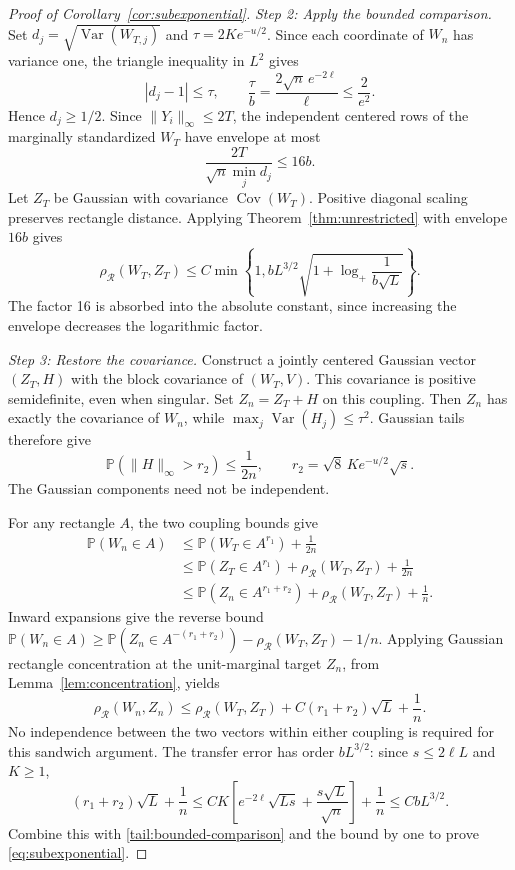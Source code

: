 \documentclass[11pt,letterpaper]{article}
\theoremstyle{remark}
\newcommand{\Pp}{\mathbb P}
\newcommand{\Cov}{\operatorname{Cov}}
\newcommand{\Var}{\operatorname{Var}}
\newcommand{\rh}{\rho_{\mathcal R}}
\begin{document}
\begin{proof}[Proof of Corollary~\ref{cor:subexponential}]
\emph{Step 2: Apply the bounded comparison.}
Set \(d_j=\sqrt{\Var(W_{T,j})}\) and \(\tau=2Ke^{-u/2}\).
Since each coordinate of \(W_n\) has variance one, the triangle
inequality in \(L^2\) gives
\[
 |d_j-1|\le\tau,
 \qquad \frac\tau b=\frac{2\sqrt n\,e^{-2\ell}}\ell
 \le\frac2{e^2}.
\]
Hence \(d_j\ge1/2\). Since \(\|Y_i\|_\infty\le2T\), the
independent centered rows of the marginally standardized \(W_T\)
have envelope at most
\[
 \frac{2T}{\sqrt n\min_jd_j}\le16b.
\]
Let \(Z_T\) be Gaussian with covariance \(\Cov(W_T)\).
Positive diagonal scaling preserves rectangle distance. Applying
Theorem~\ref{thm:unrestricted} with envelope \(16b\) gives
\begin{equation}
 \rh(W_T,Z_T)\le C\min\left\{1,
 bL^{3/2}\sqrt{1+\log_+\frac1{b\sqrt L}}\right\}.
 \label{tail:bounded-comparison}
\end{equation}
The factor 16 is absorbed into the absolute constant, since increasing
the envelope decreases the logarithmic factor.

\emph{Step 3: Restore the covariance.}
Construct a jointly centered Gaussian vector \((Z_T,H)\) with the
block covariance of \((W_T,V)\). This covariance is positive
semidefinite, even when singular. Set \(Z_n=Z_T+H\) on this coupling.
Then \(Z_n\) has exactly the covariance of \(W_n\), while
\(\max_j\Var(H_j)\le\tau^2\). Gaussian tails therefore give
\begin{equation}
 \Pp(\|H\|_\infty>r_2)\le\frac1{2n},\qquad
 r_2=\sqrt8\,Ke^{-u/2}\sqrt s.
 \label{tail:Gaussian-coupling}
\end{equation}
The Gaussian components need not be independent.

For any rectangle \(A\), the two coupling bounds give
\begin{align*}
 \Pp(W_n\in A)
 &\le\Pp(W_T\in A^{r_1})+\frac1{2n}\\
 &\le\Pp(Z_T\in A^{r_1})+\rh(W_T,Z_T)+\frac1{2n}\\
 &\le\Pp(Z_n\in A^{r_1+r_2})+\rh(W_T,Z_T)+\frac1n.
\end{align*}
Inward expansions give the reverse bound
\(\Pp(W_n\in A)\ge\Pp(Z_n\in A^{-(r_1+r_2)})
-\rh(W_T,Z_T)-1/n\). Applying Gaussian rectangle concentration at
the unit-marginal target \(Z_n\), from Lemma~\ref{lem:concentration}, yields
\begin{equation}
 \rh(W_n,Z_n)\le\rh(W_T,Z_T)
       +C(r_1+r_2)\sqrt L+\frac1n.
 \label{tail:transfer}
\end{equation}
No independence between the two vectors within either coupling is
required for this sandwich argument.
The transfer error has order \(bL^{3/2}\): since
\(s\le2\ell L\) and \(K\ge1\),
\[
 (r_1+r_2)\sqrt L+\frac1n
 \le CK\left[e^{-2\ell}\sqrt{Ls}
                     +\frac{s\sqrt L}{\sqrt n}\right]+\frac1n
 \le CbL^{3/2}.
\]
Combine this with \eqref{tail:bounded-comparison} and the bound by one
to prove \eqref{eq:subexponential}.


\end{proof}
\end{document}
